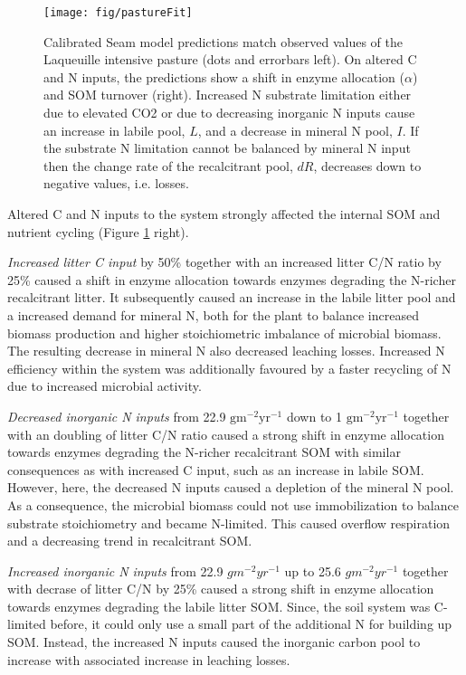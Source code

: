 \begin{figure}[t] \vspace*{2mm}
\label{fig:pastureFit}
\begin{center}
\texttt{[image: fig/pastureFit]} 
\end{center}
\caption{Calibrated Seam model predictions match observed values of the
Laqueuille intensive pasture (dots and errorbars left). On altered C and N
inputs, the predictions show a shift in enzyme allocation ($\alpha$) and SOM
turnover (right).
Increased N substrate limitation either due to elevated CO2 or due to
decreasing inorganic N inputs cause an increase in labile pool, $L$, and a
decrease in mineral N pool, $I$. If the substrate N limitation cannot be balanced by mineral N
input then the change rate of the recalcitrant pool, $dR$, decreases down to
negative values, i.e. losses.
}
\end{figure}   

Altered C and N inputs to the system strongly affected the internal SOM and
nutrient cycling (Figure \ref{fig:pastureFit} right). 

\textit{Increased litter C input} by 50\% together with an increased litter
C/N ratio by 25\% caused a shift in enzyme allocation towards enzymes degrading the
N-richer recalcitrant litter. It subsequently caused an increase in the
labile litter pool and a increased demand for mineral N, both for 
the plant to balance increased biomass production and higher stoichiometric
imbalance of microbial biomass. The resulting decrease in mineral N also
decreased leaching losses. Increased N efficiency within the system was
additionally favoured by a faster recycling of N due to increased
microbial activity. 

\textit{Decreased inorganic N inputs} from 22.9
${\textrm{gm}^{-2}\textrm{yr}^{-1}}$ down to 1
${\textrm{gm}^{-2}\textrm{yr}^{-1}}$ together with an doubling of litter C/N
ratio caused a strong shift in enzyme allocation towards enzymes degrading the
N-richer recalcitrant SOM with similar consequences as with increased C input,
such as an increase in labile SOM. However, here, the decreased N inputs caused
a depletion of the mineral N pool.
As a consequence, the microbial biomass could not use immobilization to
balance substrate stoichiometry and became N-limited.
This caused overflow respiration and a decreasing trend in recalcitrant SOM.

\textit{Increased inorganic N inputs} from 22.9 $gm^{-2}yr^{-1}$ up to 25.6
$gm^{-2}yr^{-1}$ together with decrase of litter C/N by 25\% caused a strong
shift in enzyme allocation towards enzymes degrading the labile litter SOM.
Since, the soil system was C-limited before, it could only use a small part of
the additional N for building up SOM.
Instead, the increased N inputs caused the inorganic carbon pool to increase
with associated increase in leaching losses.

